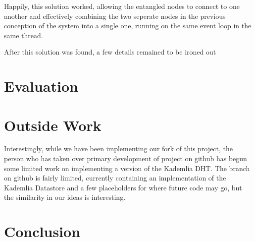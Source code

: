 \documentclass[12pt,twocolumn]{article}
\begin{document}
Happily, this solution worked, allowing the entangled nodes to connect to one another and effectively combining the two seperate nodes in the previous conception of the system into a single one, running on the same event loop in the same thread.

After this solution was found, a few details remained to be ironed out 

\section{Evaluation}


\section{Outside Work}
Interestingly, while we have been implementing our fork of this project, the person who has taken over primary development of project on github has begun some limited work on implementing a version of the Kademlia DHT. The branch on github is fairly limited, currently containing an implementation of the Kademlia Datastore and a few placeholders for where future code may go, but the similarity in our ideas is interesting.

\section{Conclusion}
\end{document}
